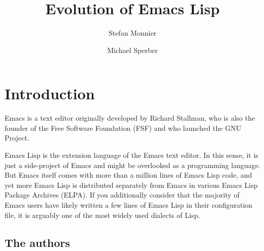 \documentclass[format=acmsmall, review]{acmart}
\newcommand \Elisp {Emacs Lisp}
\begin{document}
\title{Evolution of Emacs Lisp}

\author{Stefan Monnier}
\author{Michael Sperber}









\maketitle

\tableofcontents

\section{Introduction}

Emacs is a text editor originally developed by Richard Stallman, who is also
the founder of the Free Software Foundation (FSF) and who launched the GNU
Project.

\Elisp{} is the extension language of the Emacs text editor.
In this sense, it is just a side-project of Emacs and might be overlooked as
a programming language.  But Emacs itself comes with more than a million
lines of \Elisp{} code, and yet more \Elisp{} is distributed separately from
Emacs in various Emacs Lisp Package Archives (ELPA).  If you additionally
consider that the majority of Emacs users have likely written a few lines of
\Elisp{} in their configuration file, it is arguably one of the most widely
used dialects of Lisp.


\subsection{The authors}
\end{document}
